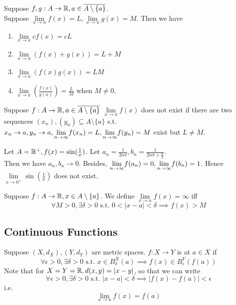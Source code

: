 \documentclass[11pt]{article}
\begin{document}
Suppose $f, g: A \rightarrow \mathbb{R}, a \in \overline{A \setminus \{a\}}$.\\
Suppose $\underset{x \rightarrow a}{\lim} f(x) = L, \underset{x \rightarrow a}{\lim} g(x) = M$. Then we have
\begin{enumerate}
	\item $\underset{x \rightarrow a}{\lim} cf(x) = cL$
	\item $\underset{x \rightarrow a}{\lim} (f(x) + g(x)) = L + M$
	\item $\underset{x \rightarrow a}{\lim} (f(x)g(x)) = LM$
	\item $\underset{x \rightarrow a}{\lim} (\frac{f(x)}{g(x)}) = \frac{L}{M}$ when $M \neq 0$.
\end{enumerate}

 Suppose $f: A \rightarrow \mathbb{R}, a \in \overline{A \setminus \{a\}}$ $\underset{x \rightarrow a}{\lim} f(x)$ does not exist if there are two sequences $(x_n), (y_n) \subseteq A \setminus \{a\}$ s.t. $x_n \rightarrow a, y_n \rightarrow a, \underset{n \rightarrow \infty}{\lim} f(x_n) = L, \underset{n \rightarrow \infty}{\lim} f(y_n) = M$ exist but $L \neq M$.

\example
Let $A = \mathbb{R}^+, f(x) = \sin(\frac{1}{x})$. Let $a_n = \frac{1}{2n\pi}, b_n = \frac{1}{2n\pi + \frac{\pi}{2}}$. \\
Then we have $a_n, b_n \rightarrow 0$. Besides, $\underset{n \rightarrow \infty}{\lim} f(a_n) = 0, \underset{n \rightarrow \infty}{\lim} f(b_n) = 1$. Hence $\underset{x \rightarrow 0^+}{\lim} \sin(\frac{1}{x})$ does not exist.

Suppose $f: A \rightarrow \mathbb{R}, x \in A \setminus \{a\}$. We define $\underset{x \rightarrow a}{\lim} f(x) = \infty$ iff
$$\forall M > 0, \exists \delta > 0 \text{ s.t. } 0 < |x - a| < \delta \implies f(x) > M$$


\subsection{Continuous Functions}
 Suppose $(X, d_X), (Y, d_Y)$ are metric spaces. $f: X \rightarrow Y$ is  at $a \in X$ if 
 $$\forall \epsilon > 0, \exists \delta > 0 \text{ s.t. } x \in B_{\delta}^X(a) \implies f(x) \in B_{\epsilon}^Y(f(a))$$
 \remark
 Note that for $X = Y = \mathbb{R}, d(x,y) = |x - y|$, so that we can write
 $$\forall \epsilon > 0, \exists \delta > 0 \text{ s.t. } |x - a| < \delta \implies |f(x) - f(a)| < \epsilon$$
 i.e. $$\underset{x \rightarrow a}{\lim} f(x) = f(a)$$
\end{document}
